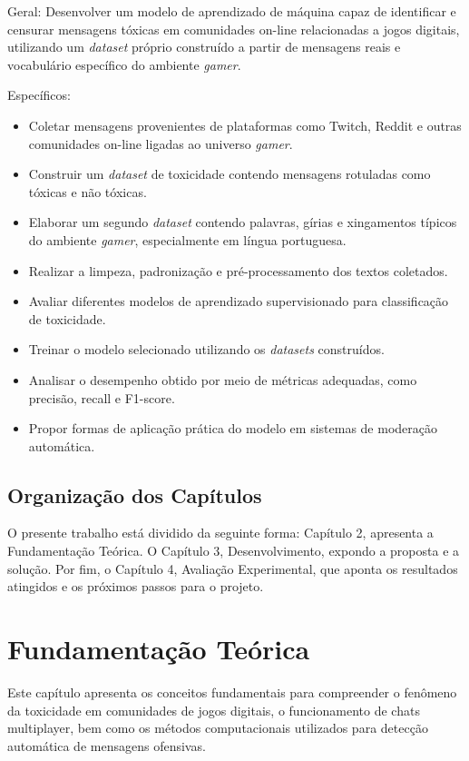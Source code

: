 \documentclass{eic-bcc-tcc}
\begin{document}
Geral: Desenvolver um modelo de aprendizado de máquina capaz de identificar e censurar mensagens tóxicas em comunidades on-line relacionadas a jogos digitais, utilizando um \textit{dataset} próprio construído a partir de mensagens reais e vocabulário específico do ambiente \textit{gamer}.

Específicos:
\begin{itemize}
    \item Coletar mensagens provenientes de plataformas como Twitch, Reddit e outras comunidades  on-line  ligadas ao universo \textit{gamer}.
    \item Construir um \textit{dataset} de toxicidade contendo mensagens rotuladas como tóxicas e não tóxicas.
    \item Elaborar um segundo \textit{dataset} contendo palavras, gírias e xingamentos típicos do ambiente \textit{gamer}, especialmente em língua portuguesa.
    \item Realizar a limpeza, padronização e pré-processamento dos textos coletados.
    \item Avaliar diferentes modelos de aprendizado supervisionado para classificação de toxicidade.
    \item Treinar o modelo selecionado utilizando os \textit{datasets} construídos.
    \item Analisar o desempenho obtido por meio de métricas adequadas, como precisão, recall e F1-score.
    \item Propor formas de aplicação prática do modelo em sistemas de moderação automática.
\end{itemize}

\section{Organização dos Capítulos}

O presente trabalho está dividido da seguinte forma: Capítulo 2, apresenta a Fundamentação Teórica. O Capítulo 3, Desenvolvimento, expondo a proposta e a solução. Por fim, o Capítulo 4, Avaliação Experimental, que aponta os resultados atingidos e os próximos passos para o projeto.

\chapter{Fundamentação Teórica}
\label{cha:fundamentacao}

Este capítulo apresenta os conceitos fundamentais para compreender o fenômeno da toxicidade em comunidades de jogos digitais, o funcionamento de chats multiplayer, bem como os métodos computacionais utilizados para detecção automática de mensagens ofensivas.
\end{document}
